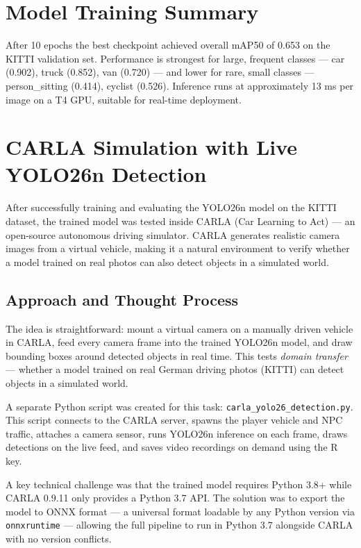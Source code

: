 \documentclass[12pt, a4paper]{article}
\begin{document}
\section{Model Training Summary}

After 10 epochs the best checkpoint achieved overall mAP50 of 0.653 on the KITTI validation set.
Performance is strongest for large, frequent classes --- car (0.902), truck (0.852), van (0.720) ---
and lower for rare, small classes --- person\_sitting (0.414), cyclist (0.526). Inference runs at
approximately 13 ms per image on a T4 GPU, suitable for real-time deployment.

\newpage

\section{CARLA Simulation with Live YOLO26n Detection}

After successfully training and evaluating the YOLO26n model on the KITTI dataset, the trained model
was tested inside CARLA (Car Learning to Act) --- an open-source autonomous driving simulator. CARLA
generates realistic camera images from a virtual vehicle, making it a natural environment to verify
whether a model trained on real photos can also detect objects in a simulated world.

\subsection{Approach and Thought Process}

The idea is straightforward: mount a virtual camera on a manually driven vehicle in CARLA, feed every
camera frame into the trained YOLO26n model, and draw bounding boxes around detected objects in real
time. This tests \textit{domain transfer} --- whether a model trained on real German driving photos
(KITTI) can detect objects in a simulated world.

A separate Python script was created for this task: \texttt{carla\_yolo26\_detection.py}. This script
connects to the CARLA server, spawns the player vehicle and NPC traffic, attaches a camera sensor,
runs YOLO26n inference on each frame, draws detections on the live feed, and saves video recordings
on demand using the R key.

A key technical challenge was that the trained model requires Python 3.8+ while CARLA 0.9.11 only
provides a Python 3.7 API. The solution was to export the model to ONNX format --- a universal format
loadable by any Python version via \texttt{onnxruntime} --- allowing the full pipeline to run in
Python 3.7 alongside CARLA with no version conflicts.
\end{document}
